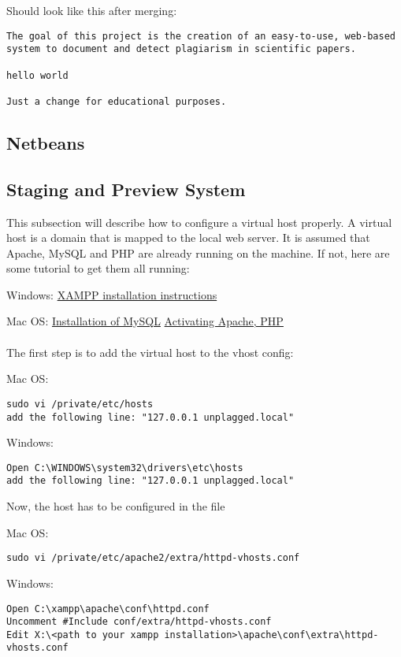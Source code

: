 Should look like this after merging:

\begin{lstlisting}[caption=Creating branches]
The goal of this project is the creation of an easy-to-use, web-based
system to document and detect plagiarism in scientific papers.

hello world

Just a change for educational purposes.
\end{lstlisting}

\subsection{Netbeans}

\subsection{Staging and Preview System}

This subsection will describe how to configure a virtual host properly. A virtual host is a domain that is mapped to the local web server. It is assumed that Apache, MySQL and PHP are already running on the machine. If not, here are some tutorial to get them all running:

Windows: \href{http://www.apachefriends.org/de/xampp-windows.html#1098}{XAMPP installation instructions}

Mac OS: \href{http://www.djangoapp.com/blog/2011/07/24/installation-of-mysql-server-on-mac-os-x-lion/}{Installation of MySQL} \href{http://www.quarkstar.at/index.php/2009/05/18/webserver-aktivieren-und-konfigurieren-in-mac-os-x/}{Activating Apache, PHP}
\\\\The first step is to add the virtual host to the vhost config: 

Mac OS: 
\begin{verbatim}
sudo vi /private/etc/hosts
add the following line: "127.0.0.1 unplagged.local"
\end{verbatim}
Windows:
\begin{verbatim}
Open C:\WINDOWS\system32\drivers\etc\hosts
add the following line: "127.0.0.1 unplagged.local"
\end{verbatim}
Now, the host has to be configured in the file

Mac OS:
\begin{verbatim}
sudo vi /private/etc/apache2/extra/httpd-vhosts.conf
\end{verbatim}
Windows:
\begin{verbatim}
Open C:\xampp\apache\conf\httpd.conf
Uncomment #Include conf/extra/httpd-vhosts.conf
Edit X:\<path to your xampp installation>\apache\conf\extra\httpd-vhosts.conf
\end{verbatim}

